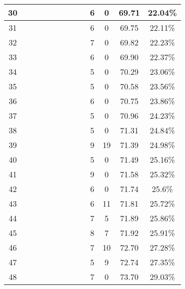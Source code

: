 \begin{longtable}{|c|c|c|c|c|c|c|c|c|c|c|c|c|}
30 &  \x    & \x    & \x    & \x    & \x\m  &       &       & \x    & 6 & 0 & 69.71 & 22.04\% \\ \hline
31 &  \x    & \x    & \x    &       & \x    &       &       & \x    & 6 & 0 & 69.75 & 22.11\% \\ \hline
32 &  \x    & \x    & \x    & \x    & \x    &       & \x    &       & 7 & 0 & 69.82 & 22.23\% \\ \hline
33 &  \x    & \x    & \x    &       &       &       &       &       & 6 & 0 & 69.90 & 22.37\% \\ \hline
34 &  \x    & \x    & \x    & \x    &       & \x\m  & \x    &       & 5 & 0 & 70.29 & 23.06\% \\ \hline
35 &  \x    & \x    & \x    &       & \x    & \x    & \x    &       & 5 & 0 & 70.58 & 23.56\% \\ \hline
36 &  \x    & \x    & \x    & \x    & \x    & \x    &       & \x    & 6 & 0 & 70.75 & 23.86\% \\ \hline
37 &  \x    & \x    & \x    &       & \x    & \x    &       & \x\m  & 5 & 0 & 70.96 & 24.23\% \\ \hline
38 &  \x    & \x    & \x    & \x    &       &       &       &       & 5 & 0 & 71.31 & 24.84\% \\ \hline
39 &  \x    & \x    &       & \x    & \x\m  & \x\m  &       &       & 9 & 19 & 71.39 & 24.98\% \\ \hline
40 &  \x    & \x    & \x    &       & \x    & \x    &       &       & 5 & 0 & 71.49 & 25.16\% \\ \hline
41 &  \x    & \x    & \x    & \x    &       &       &       &       & 9 & 0 & 71.58 & 25.32\% \\ \hline
42 &  \x    & \x    & \x    & \x    &       & \x    &       & \x\m  & 6 & 0 & 71.74 & 25.6\% \\ \hline
43 &  \x    & \x    & \x    &       & \x\m  &       & \x\m  &       & 6 & 11 & 71.81 & 25.72\% \\ \hline
44 &  \x    & \x    & \x    &       & \x\m  & \x\m  &       & \x\m  & 7 & 5 & 71.89 & 25.86\% \\ \hline
45 &  \x    & \x    & \x    & \x    & \x\m  & \x    &       & \x    & 8 & 7 & 71.92 & 25.91\% \\ \hline
46 &  \x    & \x    & \x    &       & \x\m  &       &       & \x\m  & 7 & 10 & 72.70 & 27.28\% \\ \hline
47 &  \x    & \x    & \x    &       & \x\m  & \x    &       & \x    & 5 & 9 & 72.74 & 27.35\% \\ \hline
48 &  \x    & \x    & \x    & \x    & \x\m  &       &       &       & 7 & 0 & 73.70 & 29.03\% \\ \hline

\end{longtable}
